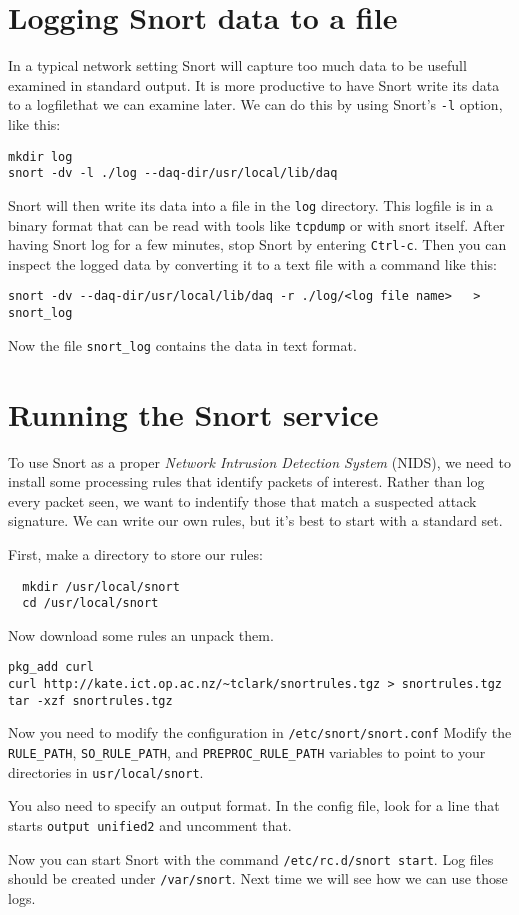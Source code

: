 \documentclass{article}
\begin{document}
\section{Logging Snort data to a file}
In a typical network setting Snort will capture too much data to be usefull examined in standard output.  It is more productive to have Snort write its data to a logfilethat we can examine later.  We can do this by using Snort's \texttt{-l} option, like this:


\begin{verbatim}
mkdir log
snort -dv -l ./log --daq-dir/usr/local/lib/daq
\end{verbatim}

Snort will then write its data into a file in the \texttt{log} directory.  This logfile is in a binary format that can be read with tools like \texttt{tcpdump} or with snort itself.  After having Snort log for a few minutes, stop Snort by entering \texttt{Ctrl-c}.  Then you can inspect the logged data by converting it to a text file with a command like this:


\begin{verbatim}
snort -dv --daq-dir/usr/local/lib/daq -r ./log/<log file name>   > snort_log
\end{verbatim}

Now the file \texttt{snort\_log} contains the data in text format.

\section{Running the Snort service}
To use Snort as a proper \emph{Network Intrusion Detection System} (NIDS), we need to install some processing rules that identify packets of interest.  Rather than log every packet seen, we want to indentify those that match a suspected attack signature.  We can write our own rules, but it's best to start with a standard set.

First, make a directory to store our rules:

\begin{verbatim}
  mkdir /usr/local/snort
  cd /usr/local/snort
  \end{verbatim}

Now download some rules an unpack them.

\begin{verbatim}
pkg_add curl
curl http://kate.ict.op.ac.nz/~tclark/snortrules.tgz > snortrules.tgz
tar -xzf snortrules.tgz
\end{verbatim}

Now you need to modify the configuration in \texttt{/etc/snort/snort.conf} Modify the \texttt{RULE\_PATH}, \texttt{SO\_RULE\_PATH}, and \texttt{PREPROC\_RULE\_PATH} variables to point to your directories in \texttt{usr/local/snort}.

You also need to specify an output format.  In the config file, look for a line that starts \texttt{output unified2} and uncomment that.

Now you can start Snort with the command \texttt{/etc/rc.d/snort start}.  Log files should be created under \texttt{/var/snort}.  Next time we will see how we can use those logs.
\end{document}
